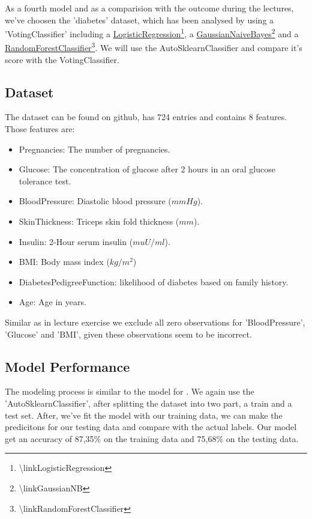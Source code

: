 As a fourth model and as a comparision with the outcome during the lectures, we've choosen the 'diabetes' dataset, which has been analysed by using a 'VotingClassifier' including a \href{\linkLogisticRegression}{LogisticRegression\footnote{\url{\linkLogisticRegression}}}, a \href{\linkGaussianNB}{GaussianNaiveBayes\footnote{\url{\linkGaussianNB}}} and a \href{\linkRandomForestClassifier}{RandomForestClassifier\footnote{\url{\linkRandomForestClassifier}}}. We will use the AutoSklearnClassifier and compare it's score with the VotingClassifier.

\subsection{Dataset}

The dataset can be found on github, has 724 entries and contains 8 features. Those features are:

\begin{itemize}
  \item Pregnancies: The number of pregnancies.
  \item Glucose: The concentration of glucose after 2 hours in an oral glucose tolerance test.
  \item BloodPressure: Diastolic blood pressure ($mm Hg$).
  \item SkinThickness: Triceps skin fold thickness ($mm$).
  \item Insulin: 2-Hour serum insulin ($mu U/ml$).
  \item BMI: Body mass index ($kg/m^2$)
  \item DiabetesPedigreeFunction: likelihood of diabetes based on family history.
  \item Age: Age in years.
\end{itemize}

Similar as in lecture exercise we exclude all zero observations for 'BloodPressure', 'Glucose' and 'BMI', given these observations seem to be incorrect.

\subsection{Model Performance}

The modeling process is similar to the model for . We again use the 'AutoSklearnClassifier', after splitting the dataset into two part, a train and a test set.
After, we've fit the model with our training data, we can make the predicitons for our testing data and compare with the actual labels.
Our model get an accuracy of 87,35\% on the training data and 75,68\% on the testing data.

